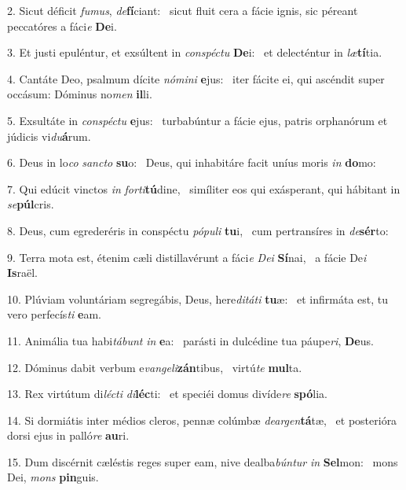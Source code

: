 2. Sicut déficit \textit{fu}\textit{mus}, \textit{de}\textbf{fí}ciant: \ast\  sicut fluit cera a fácie ignis, sic péreant peccatóres a fáci\textit{e} \textbf{De}i.\

3. Et justi epuléntur, et exsúltent in \textit{con}\textit{spéc}\textit{tu} \textbf{De}i: \ast\  et delecténtur in \textit{læ}\textbf{tí}tia.\

4. Cantáte Deo, psalmum dícite \textit{nó}\textit{mi}\textit{ni} \textbf{e}jus: \ast\  iter fácite ei, qui ascéndit super occásum: Dóminus no\textit{men} \textbf{il}li.\

5. Exsultáte in \textit{con}\textit{spéc}\textit{tu} \textbf{e}jus: \ast\  turbabúntur a fácie ejus, patris orphanórum et júdicis vi\textit{du}\textbf{á}rum.\

6. Deus in lo\textit{co} \textit{sanc}\textit{to} \textbf{su}o: \ast\  Deus, qui inhabitáre facit uníus moris \textit{in} \textbf{do}mo:\

7. Qui edúcit vinctos \textit{in} \textit{for}\textit{ti}\textbf{tú}dine, \ast\  simíliter eos qui exásperant, qui hábitant in \textit{se}\textbf{púl}cris.\

8. Deus, cum egrederéris in conspéctu \textit{pó}\textit{pu}\textit{li} \textbf{tu}i, \ast\  cum pertransíres in \textit{de}\textbf{sér}to:\

9. Terra mota est, étenim cæli distillavérunt a fáci\textit{e} \textit{De}\textit{i} \textbf{Sí}nai, \ast\  a fácie De\textit{i} \textbf{Is}raël.\

10. Plúviam voluntáriam segregábis, Deus, here\textit{di}\textit{tá}\textit{ti} \textbf{tu}æ: \ast\  et infirmáta est, tu vero perfecís\textit{ti} \textbf{e}am.\

11. Animália tua habi\textit{tá}\textit{bunt} \textit{in} \textbf{e}a: \ast\  parásti in dulcédine tua páupe\textit{ri}, \textbf{De}us.\

12. Dóminus dabit verbum e\textit{van}\textit{ge}\textit{li}\textbf{zán}tibus, \ast\  virtú\textit{te} \textbf{mul}ta.\

13. Rex virtútum di\textit{léc}\textit{ti} \textit{di}\textbf{léc}ti: \ast\  et speciéi domus divíde\textit{re} \textbf{spó}lia.\

14. Si dormiátis inter médios cleros, pennæ colúmbæ \textit{de}\textit{ar}\textit{gen}\textbf{tá}tæ, \ast\  et posterióra dorsi ejus in palló\textit{re} \textbf{au}ri.\

15. Dum discérnit cæléstis reges super eam, nive dealba\textit{bún}\textit{tur} \textit{in} \textbf{Sel}mon: \ast\  mons Dei, \textit{mons} \textbf{pin}guis.\


